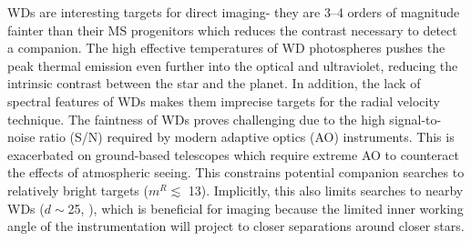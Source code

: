 \documentclass[twocolumn]{aastex631}
\begin{document}
WDs are interesting targets for direct imaging- they are \numrange{3}{4} orders of magnitude fainter than their MS progenitors which reduces the contrast necessary to detect a companion. The high effective temperatures of WD photospheres pushes the peak thermal emission even further into the optical and ultraviolet, reducing the intrinsic contrast between the star and the planet. In addition, the lack of spectral features of WDs \citep{schatzmanTheorieDebitEnergie1945} makes them imprecise targets for the radial velocity technique. The faintness of WDs proves challenging due to the high signal-to-noise ratio (S/N) required by modern adaptive optics (AO) instruments. This is exacerbated on ground-based telescopes which require extreme AO to counteract the effects of atmospheric seeing. This constrains potential companion searches to relatively bright targets ($m^R\lesssim$ 13). Implicitly, this also limits searches to nearby WDs ($d\sim$\qty{25}{\parsec}, \citealp{holberg25ParsecLocal2016}), which is beneficial for imaging because the limited inner working angle of the instrumentation will project to closer separations around closer stars.





\end{document}

